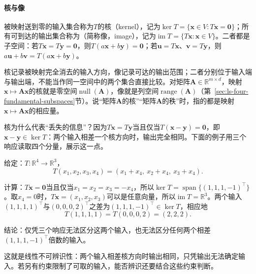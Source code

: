 \paragraph{核与像}
被映射送到零的输入集合称为$T$的核（kernel），记为$\ker T=\{\bm x\in V:T\bm x=\bm0\}$；所有可到达的输出集合称为（简称像，image），记为$\operatorname{im}T=\{T\bm x:\bm x\in V\}$。二者都是子空间：若$T\bm x=T\bm y=\bm0$，则$T(a\bm x+b\bm y)=\bm0$；若$\bm u=T\bm x$、$\bm v=T\bm y$，则$a\bm u+b\bm v=T(a\bm x+b\bm y)$。

核记录被映射完全消去的输入方向，像记录可达的输出范围；二者分别位于输入端与输出端，不能当作同一空间中的两个集合直接比较。对矩阵$\bm A\in\mathbb R^{m\times d}$，映射$\bm x\mapsto\bm A\bm x$的核就是零空间$\operatorname{null}(\bm A)$，像就是列空间$\operatorname{range}(\bm A)$（第~\ref{sec:ls-four-fundamental-subspaces}节）。说“矩阵$\bm A$的核”“矩阵$\bm A$的秩”时，指的都是映射$\bm x\mapsto\bm A\bm x$的相应量。

核为什么代表“丢失的信息”？因为$T\bm x=T\bm y$当且仅当$T(\bm x-\bm y)=\bm0$，即$\bm x-\bm y\in\ker T$：两个输入相差一个核方向时，输出完全相同。下面的例子用三个响应读取四个分量，展示这一点。
\begin{example}[相差核方向的输入给出相同输出]
\label{ex:ls-kernel-indistinguishable}
给定：$T:\mathbb R^4\to\mathbb R^3$，
\[
 T(x_1,x_2,x_3,x_4)=(x_1+x_4,\ x_2+x_4,\ x_3+x_4).
\]

计算：$T\bm x=\bm0$当且仅当$x_1=x_2=x_3=-x_4$，所以$\ker T=\operatorname{span}\{(1,1,1,-1)^{\top}\}$。取$x_4=0$时，$T\bm x=(x_1,x_2,x_3)$可以是任意向量，所以$\operatorname{im}T=\mathbb R^3$。两个输入$(1,1,1,1)^\top$与$(0,0,0,2)^\top$之差为$(1,1,1,-1)^\top\in\ker T$，相应地
\[
 T(1,1,1,1)=T(0,0,0,2)=(2,2,2).
\]

结论：仅凭三个响应无法区分这两个输入，也无法区分任何两个相差$(1,1,1,-1)^\top$倍数的输入。
\end{example}
这就是线性不可辨识性：两个输入相差核方向时输出相同，只凭输出无法确定输入。若另有约束限制了可取的输入，能否辨识还要结合这些约束判断。

